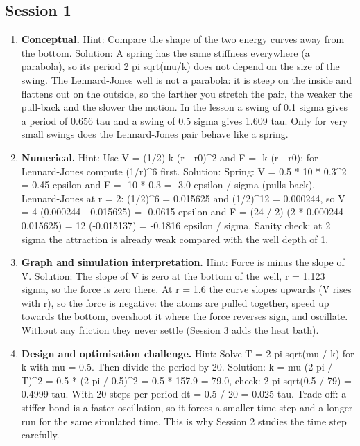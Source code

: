 \documentclass[11pt,a4paper]{article}
\begin{document}
\subsection*{Session 1}
\begin{enumerate}[nosep]
\item \textbf{Conceptual.} Hint: Compare the shape of the two energy curves away from the bottom. Solution: A spring has the same stiffness everywhere (a parabola), so its period 2 pi sqrt(mu/k) does not depend on the size of the swing. The Lennard-Jones well is not a parabola: it is steep on the inside and flattens out on the outside, so the farther you stretch the pair, the weaker the pull-back and the slower the motion. In the lesson a swing of 0.1 sigma gives a period of 0.656 tau and a swing of 0.5 sigma gives 1.609 tau. Only for very small swings does the Lennard-Jones pair behave like a spring.
\item \textbf{Numerical.} Hint: Use V = (1/2) k (r - r0)\textasciicircum{}2 and F = -k (r - r0); for Lennard-Jones compute (1/r)\textasciicircum{}6 first. Solution: Spring: V = 0.5 * 10 * 0.3\textasciicircum{}2 = 0.45 epsilon and F = -10 * 0.3 = -3.0 epsilon / sigma (pulls back). Lennard-Jones at r = 2: (1/2)\textasciicircum{}6 = 0.015625 and (1/2)\textasciicircum{}12 = 0.000244, so V = 4 (0.000244 - 0.015625) = -0.0615 epsilon and F = (24 / 2) (2 * 0.000244 - 0.015625) = 12 (-0.015137) = -0.1816 epsilon / sigma. Sanity check: at 2 sigma the attraction is already weak compared with the well depth of 1.
\item \textbf{Graph and simulation interpretation.} Hint: Force is minus the slope of V. Solution: The slope of V is zero at the bottom of the well, r = 1.123 sigma, so the force is zero there. At r = 1.6 the curve slopes upwards (V rises with r), so the force is negative: the atoms are pulled together, speed up towards the bottom, overshoot it where the force reverses sign, and oscillate. Without any friction they never settle (Session 3 adds the heat bath).
\item \textbf{Design and optimisation challenge.} Hint: Solve T = 2 pi sqrt(mu / k) for k with mu = 0.5. Then divide the period by 20. Solution: k = mu (2 pi / T)\textasciicircum{}2 = 0.5 * (2 pi / 0.5)\textasciicircum{}2 = 0.5 * 157.9 = 79.0, check: 2 pi sqrt(0.5 / 79) = 0.4999 tau. With 20 steps per period dt = 0.5 / 20 = 0.025 tau. Trade-off: a stiffer bond is a faster oscillation, so it forces a smaller time step and a longer run for the same simulated time. This is why Session 2 studies the time step carefully.
\end{enumerate}
\end{document}
